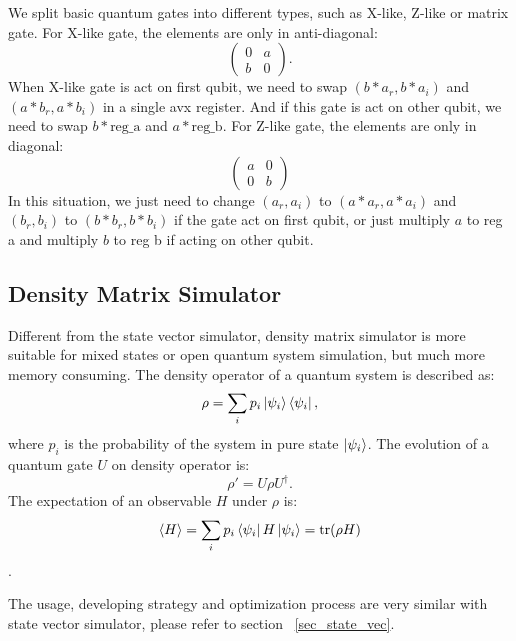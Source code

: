 We split basic quantum gates into different types, such as X-like, Z-like or matrix gate. For X-like gate, the elements are only in anti-diagonal:
\begin{equation}
    \begin{pmatrix}
        0 & a \\
        b & 0
    \end{pmatrix}.
\end{equation}
When X-like gate is act on first qubit, we need to swap $(b*a_r, b*a_i)$ and $(a*b_r, a*b_i)$ in a single avx register. And if this gate is act on other qubit, we need to swap $b*\text{reg\_a}$ and $a*\text{reg\_b}$. For Z-like gate, the elements are only in diagonal:
\begin{equation}
    \begin{pmatrix}
        a & 0 \\
        0 & b
    \end{pmatrix}
\end{equation}
In this situation, we just need to change $(a_r, a_i)$ to $(a*a_r, a*a_i)$ and $(b_r, b_i)$ to $(b*b_r, b*b_i)$ if the gate act on first qubit, or just multiply $a$ to reg a and multiply $b$ to reg b if acting on other qubit.

\subsection{Density Matrix Simulator}
Different from the state vector simulator, density matrix simulator is more suitable for mixed states or open quantum system simulation, but much more memory consuming. The density operator of a quantum system is described as:
\begin{equation}
    \rho=\sum_ip_i\ket{\psi_i}\bra{\psi_i},
\end{equation}
where $p_i$ is the probability of the system in pure state $\ket{\psi_i}$. The evolution of a quantum gate $U$ on density operator is:
\begin{equation}
    \rho'=U\rho U^\dagger.
\end{equation}
The expectation of an observable $H$ under $\rho$ is:
\begin{equation}
    \left<H\right> = \sum_ip_i\bra{\psi_i}H\ket{\psi_i}=\text{tr}(\rho H)
\end{equation}.

The usage, developing strategy and optimization process are very similar with state vector simulator, please refer to section ~\ref{sec_state_vec}.
